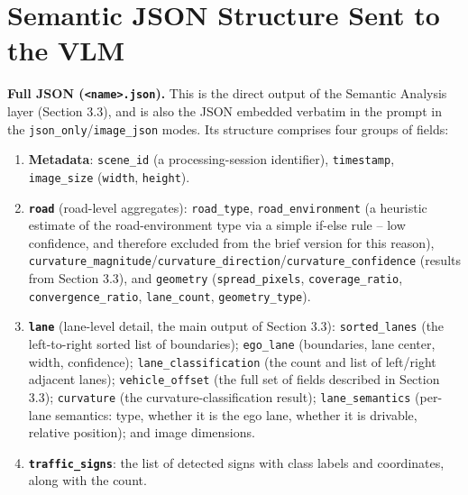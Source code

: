 \documentclass[12pt,a4paper]{report}
\begin{document}
\section{Semantic JSON Structure Sent to the VLM}

\textbf{Full JSON (\texttt{<name>.json}).} This is the direct output of the Semantic Analysis layer (Section 3.3), and is also the JSON embedded verbatim in the prompt in the \texttt{json\_only}/\texttt{image\_json} modes. Its structure comprises four groups of fields:

\begin{enumerate}
    \item \textbf{Metadata}: \texttt{scene\_id} (a processing-session identifier), \texttt{timestamp}, \texttt{image\_size} (\texttt{width}, \texttt{height}).
    \item \textbf{\texttt{road}} (road-level aggregates): \texttt{road\_type}, \texttt{road\_environment} (a heuristic estimate of the road-environment type via a simple if-else rule -- low confidence, and therefore excluded from the brief version for this reason), \texttt{curvature\_magnitude}/\texttt{curvature\_direction}/\texttt{curvature\_confidence} (results from Section 3.3), and \texttt{geometry} (\texttt{spread\_pixels}, \texttt{coverage\_ratio}, \texttt{convergence\_ratio}, \texttt{lane\_count}, \texttt{geometry\_type}).
    \item \textbf{\texttt{lane}} (lane-level detail, the main output of Section 3.3): \texttt{sorted\_lanes} (the left-to-right sorted list of boundaries); \texttt{ego\_lane} (boundaries, lane center, width, confidence); \texttt{lane\_classification} (the count and list of left/right adjacent lanes); \texttt{vehicle\_offset} (the full set of fields described in Section 3.3); \texttt{curvature} (the curvature-classification result); \texttt{lane\_semantics} (per-lane semantics: type, whether it is the ego lane, whether it is drivable, relative position); and image dimensions.
    \item \textbf{\texttt{traffic\_signs}}: the list of detected signs with class labels and coordinates, along with the count.
\end{enumerate}
\end{document}

